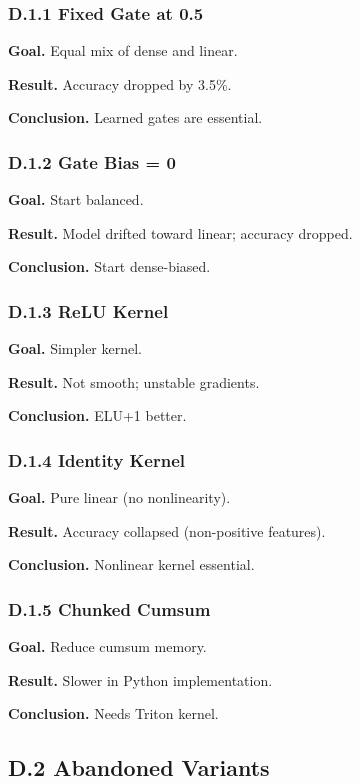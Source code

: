 \subsubsection{D.1.1 Fixed Gate at 0.5}

\textbf{Goal.} Equal mix of dense and linear.

\textbf{Result.} Accuracy dropped by 3.5\%.

\textbf{Conclusion.} Learned gates are essential.

\subsubsection{D.1.2 Gate Bias = 0}

\textbf{Goal.} Start balanced.

\textbf{Result.} Model drifted toward linear; accuracy dropped.

\textbf{Conclusion.} Start dense-biased.

\subsubsection{D.1.3 ReLU Kernel}

\textbf{Goal.} Simpler kernel.

\textbf{Result.} Not smooth; unstable gradients.

\textbf{Conclusion.} ELU+1 better.

\subsubsection{D.1.4 Identity Kernel}

\textbf{Goal.} Pure linear (no nonlinearity).

\textbf{Result.} Accuracy collapsed (non-positive features).

\textbf{Conclusion.} Nonlinear kernel essential.

\subsubsection{D.1.5 Chunked Cumsum}

\textbf{Goal.} Reduce cumsum memory.

\textbf{Result.} Slower in Python implementation.

\textbf{Conclusion.} Needs Triton kernel.

\subsection{D.2 Abandoned Variants}

